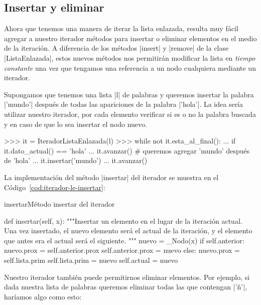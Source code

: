 \subsection{Insertar y eliminar}

Ahora que tenemos una manera de iterar la lista enlazada, resulta muy fácil
agregar a nuestro iterador métodos para insertar o eliminar elementos en el
medio de la iteración. A diferencia de los métodos |insert| y |remove| de la
clase |ListaEnlazada|, estos nuevos métodos nos permitirán modificar la lista
en \emph{tiempo constante} una vez que tengamos una referencia a un nodo
cualquiera mediante un iterador.

Supongamos que tenemos una lista |l| de palabras y queremos insertar la palabra
|'mundo'| después de todas las apariciones de la palabra |'hola'|. La idea
sería utilizar nuestro iterador, por cada elemento verificar si es o no la
palabra buscada y en caso de que lo sea insertar el nodo nuevo.

\begin{codigo-python-sn}
>>> it = IteradorListaEnlazada(l)
>>> while not it.esta_al_final():
...     if it.dato_actual() == 'hola'
...         it.avanzar() # queremos agregar 'mundo' después de 'hola'
...         it.insertar('mundo')
...     it.avanzar()
\end{codigo-python-sn}

La implementación del método |insertar| del iterador se muestra en el
Código~\ref{cod:iterador-le-insertar}:

\begin{codigo}{insertar}{Método insertar del iterador}
\label{cod:iterador-le-insertar}
\begin{codigo-python}
    def insertar(self, x):
        """Insertar un elemento en el lugar de la iteración actual.
        Una vez insertado, el nuevo elemento será el actual de la iteración,
        y el elemento que antes era el actual será el siguiente.
        """
        nuevo = _Nodo(x)
        if self.anterior:
            nuevo.prox = self.anterior.prox
            self.anterior.prox = nuevo
        else:
            nuevo.prox = self.lista.prim
            self.lista.prim = nuevo
        self.actual = nuevo
\end{codigo-python}
\end{codigo}

Nuestro iterador también puede permitirnos eliminar elementos. Por ejemplo, si
dada nuestra lista de palabras queremos eliminar todas las que contengan |'ñ'|,
haríamos algo como esto:


